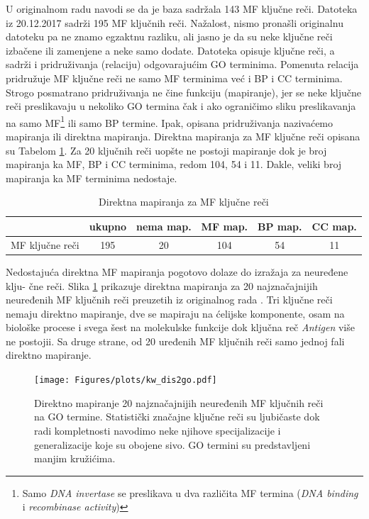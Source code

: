 U originalnom radu navodi se da je \swissprot baza sadržala 143 MF ključne
reči.  Datoteka  \cite{keywlist_txt} iz 20.12.2017 sadrži
195 MF ključnih reči.  Nažalost, nismo pronašli originalnu 
datoteku pa  ne znamo egzaktnu razliku, ali jasno je da su neke ključne reči
izbačene ili zamenjene a neke samo dodate. Datoteka  opisuje
ključne reči, a sadrži i pridruživanja (relaciju) odgovarajućim GO terminima.
Pomenuta relacija pridružuje MF ključne reči ne samo MF terminima već i BP i CC
terminima. Strogo posmatrano pridruživanja ne čine funkciju (mapiranje), jer se
neke ključne reči preslikavaju u nekoliko GO termina čak i ako ograničimo sliku
preslikavanja na samo MF\footnote{Samo \textit{DNA invertase} se preslikava u
dva različita MF termina (\textit{DNA binding} i \textit{recombinase
activity})} ili samo BP termine.  Ipak, opisana
pridruživanja nazivaćemo mapiranja ili direktna mapiranja. Direktna mapiranja
za MF ključne reči opisana su Tabelom \ref{tab:direktna_map}.  Za 20 ključnih reči
uopšte ne postoji mapiranje dok je broj mapiranja ka MF, BP i CC terminima,
redom 104, 54 i 11. Dakle, veliki broj mapiranja ka MF terminima nedostaje.

\begin{table}[htpb]
\begin{tabular}{|r|c|c|c|c|c|}
  \hline
                   & ukupno & nema map. &  MF map. & BP map. & CC map.      \\
  \hline
   MF ključne reči & 195    &  20       &  104     & 54      & 11           \\
  \hline
\end{tabular}
  \centering
  \caption{Direktna mapiranja za MF ključne reči}
  \label{tab:direktna_map}
\end{table}

Nedostajuća direktna MF mapiranja pogotovo dolaze do izražaja za neuređene
klju- čne reči.  Slika \ref{fig:KWtop20dis} prikazuje direktna mapiranja za 20
najznačajnijih neuređenih MF ključnih reči preuzetih iz originalnog rada
\parencite{Xie2007}.  Tri ključne reči nemaju direktno mapiranje, dve se
mapiraju na ćelijske komponente, osam na biološke procese i svega šest na
molekulske funkcije dok ključna reč \textit{Antigen} više ne postojii. Sa druge
strane, od 20 uređenih MF ključnih reči samo jednoj fali direktno mapiranje.

\begin{figure}[!th]
\hspace*{-2.2cm} 
\texttt{[image: Figures/plots/kw\_dis2go.pdf]}
\decoRule
\caption {
  Direktno mapiranje 20 najznačajnijih neuređenih MF ključnih reči \parencite{Xie2007}
  na GO termine.  Statistički značajne ključne reči su ljubičaste dok radi
  kompletnosti navodimo neke njihove specijalizacije i generalizacije koje su
  obojene sivo. GO termini su predstavljeni manjim kružićima.
}
\label{fig:KWtop20dis}
\end{figure}

